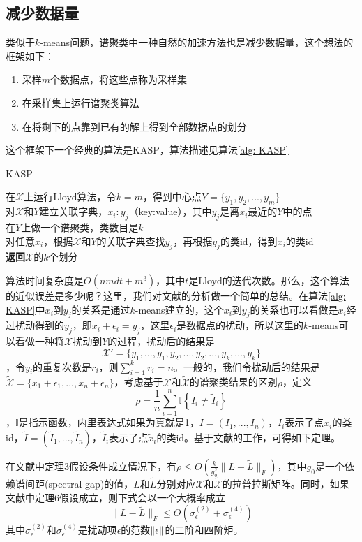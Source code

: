 \subsection{减少数据量}
类似于$k$-means问题，谱聚类中一种自然的加速方法也是减少数据量，这个想法的框架如下：
\begin{enumerate}
    \item 采样$m$个数据点，将这些点称为采样集
    \item 在采样集上运行谱聚类算法
    \item 在将剩下的点靠到已有的解上得到全部数据点的划分
\end{enumerate}
这个框架下一个经典的算法是KASP，算法描述见算法\ref{alg: KASP}
\begin{algorithm}
    \caption{KASP}\label{alg: KASP}
    在$\mathcal{X}$上运行Lloyd算法，令$k=m$，得到中心点$Y = \{y_1,y_2,...,y_m\}$\\
    对$\mathcal{X}$和$Y$建立关联字典，$x_i:y_j$（key:value），其中$y_j$是离$x_i$最近的$Y$中的点　\\
    在$Y$上做一个谱聚类，类数目是$k$ \\
    对任意$x_i$，根据$\mathcal{X}$和$Y$的关联字典查找$y_j$，再根据$y_j$的类id，得到$x_i$的类id\\
    \textbf{返回}$\mathcal{X}$的$k$个划分
\end{algorithm}
算法时间复杂度是$O(nmdt+m^3)$，其中$t$是Lloyd的迭代次数。那么，这个算法的近似误差是多少呢？这里，我们对文献\cite{yan2009fast}的分析做一个简单的总结。在算法\ref{alg: KASP}中$x_i$到$y_j$的关系是通过$k$-means建立的，这个$x_i$到$y_j$的关系也可以看做是$x_i$经过扰动得到的$y_j$，即$x_i+\epsilon_i = y_j$，这里$\epsilon_i$是数据点的扰动，所以这里的$k$-means可以看做一种将$\mathcal{X}$扰动到$Y$的过程，扰动后的结果是$$\mathcal{X}' = \{y_1,...,y_1,y_2,...,y_2,...,y_k,...,y_k\}$$，令$y_i$的重复次数是$r_i$，则$\sum_{i=1}^k r_i = n$。一般的，我们令扰动后的结果是$\tilde{\mathcal{X}} = \{x_1+\epsilon_1,...,x_n+\epsilon_n\}$，考虑基于$\mathcal{X}$和$\tilde{\mathcal{X}}$的谱聚类结果的区别$\rho$，定义$$\rho=\frac{1}{n} \sum_{i=1}^{n} \mathbb{I}\left\{I_{i} \neq \tilde{I}_{i}\right\}$$，$\mathbb{I}$是指示函数，内里表达式如果为真就是1，$I = (I_1,...,I_n)$，$I_i$表示了点$x_i$的类id，$\tilde{I} = (\tilde{I}_1,...,\tilde{I}_n)$，$\tilde{I}_i$表示了点$\tilde{x}_i$的类id。基于文献\cite{huang2009spectral}的工作，可得如下定理。
\begin{theorem}[KASP的理论保证]
    在文献\cite{yan2009fast}中定理3假设条件成立情况下，有$\rho \leq O\left(\frac{k}{g_{0}^{2}}\|L-\tilde{L}\|_{F}\right)$，其中$g_0$是一个依赖谱间距(spectral gap)的值，$L$和$\tilde{L}$分别对应$\mathcal{X}$和$\tilde{\mathcal{X}}$的拉普拉斯矩阵。同时，如果文献\cite{yan2009fast}中定理6假设成立，则下式会以一个大概率成立
    \begin{equation*}
        \|L-\tilde{L}\|_{F} \leq O\left(\sigma_{\epsilon}^{(2)}+\sigma_{\epsilon}^{(4)}\right)
    \end{equation*}
    其中$\sigma_{\epsilon}^{(2)}$和$\sigma_{\epsilon}^{(4)}$是扰动项$\epsilon$的范数$\left\lVert\epsilon\right\rVert$的二阶和四阶矩。
\end{theorem}
